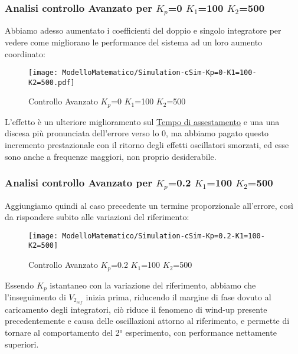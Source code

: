 \subsubsection{Analisi controllo Avanzato per $ K_p $=0 $ K_1 $=100 $ K_2 $=500}
Abbiamo adesso aumentato i coefficienti del doppio e singolo integratore per vedere come migliorano le performance del sistema ad un loro aumento coordinato:
\begin{figure}[H]
	\centering
	\caption[Controllo Avanzato $ K_p $=0 $ K_1 $=100 $ K_2 $=500]{Controllo Avanzato $ K_p $=0 $ K_1 $=100 $ K_2 $=500}
	\texttt{[image: ModelloMatematico/Simulation-cSim-Kp=0-K1=100-K2=500.pdf]}
\end{figure}
\noindent
L'effetto è un ulteriore miglioramento sul \underline{Tempo di assestamento} e una una discesa più pronunciata dell'errore verso lo 0, ma abbiamo pagato questo incremento prestazionale con il ritorno degli effetti oscillatori smorzati, ed esse sono anche a frequenze maggiori, non proprio desiderabile. 

\newpage

\subsubsection{Analisi controllo Avanzato per $ K_p $=0.2 $ K_1 $=100 $ K_2 $=500}
Aggiungiamo quindi al caso precedente un termine proporzionale all'errore, così da rispondere subito alle variazioni del riferimento: 
\begin{figure}[H]
	\centering
	\caption[Controllo Avanzato $ K_p $=0.2 $ K_1 $=100 $ K_2 $=500]{Controllo Avanzato $ K_p $=0.2 $ K_1 $=100 $ K_2 $=500}
	\texttt{[image: ModelloMatematico/Simulation-cSim-Kp=0.2-K1=100-K2=500]}
\end{figure}
\noindent
Essendo $ K_p $ istantaneo con la variazione del riferimento, abbiamo che l'inseguimento di $ V_{2_{ref}} $ inizia prima, riducendo il margine di fase dovuto al caricamento degli integratori, ciò riduce il fenomeno di wind-up presente precedentemente e causa delle oscillazioni attorno al riferimento, e permette di tornare al comportamento del 2° esperimento, con performance nettamente superiori.

\newpage

